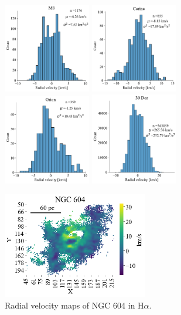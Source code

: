 \documentclass[fleqn,usenatbib, useAMS, a4paper]{mnras}
\begin{document}
\begin{figure}
\begin{multicols}{4}
\end{multicols}
\begin{multicols}{4}
\includegraphics[width=1.5in]{Figures/Hist/M8.pdf}\par
\includegraphics[width=1.5in]{Figures/Hist/Car.pdf}\par
\includegraphics[width=1.5in]{Figures/Hist/Orion.pdf}\par
\includegraphics[width=1.5in]{Figures/Hist/30Dor.pdf}\par
\end{multicols}
\caption{}
\label{fig:hist}
\end{figure}



\begin{figure}
\centering 
\includegraphics[width=2.5in]{Figures/M6T}
\caption{Radial velocity maps of NGC 604 in H$\alpha$.  }
\label{fig:M604}
\end{figure}
\end{document}
